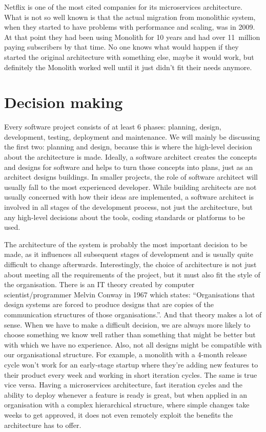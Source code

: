 \begin{note*}
    Netflix is one of the most cited companies for its microservices architecture. What is not so well known is that the actual migration from monolithic system, when they started to have problems with performance and scaling, was in 2009. At that point they had been using Monolith for 10 years and had over 11~million \cite{NETFLIX_2009_EARNINGS} paying subscribers by that time. No one knows what would happen if they started the original architecture with something else, maybe it would work, but definitely the Monolith worked well until it just didn't fit their needs anymore.
\end{note*}

\section{Decision making}
Every software project consists of at least 6 phases: planning, design, development, testing, deployment and maintenance. We will mainly be discussing the first two: planning and design, because this is where the high-level decision about the architecture is made. Ideally, a software architect creates the concepts and designs for software and helps to turn those concepts into plans, just as an architect designs buildings. In smaller projects, the role of software architect will usually fall to the most experienced developer. While building architects are not usually concerned with how their ideas are implemented, a software architect is involved in all stages of the development process, not just the architecture, but any high-level decisions about the tools, coding standards or platforms to be used.

The architecture of the system is probably the most important decision to be made, as it influences all subsequent stages of development and is usually quite difficult to change afterwards. Interestingly, the choice of architecture is not just about meeting all the requirements of the project, but it must also fit the style of the organisation. There is an IT theory created by computer scientist/programmer Melvin Conway in 1967 which states: ``Organisations that design systems are forced to produce designs that are copies of the communication structures of those organisations.''\cite{paper:conway:1968}. And that theory makes a lot of sense. When we have to make a difficult decision, we are always more likely to choose something we know well rather than something that might be better but with which we have no experience. Also, not all designs might be compatible with our organisational structure. For example, a monolith with a 4-month release cycle won't work for an early-stage startup where they're adding new features to their product every week and working in short iteration cycles. The same is true vice versa. Having a microservices architecture, fast iteration cycles and the ability to deploy whenever a feature is ready is great, but when applied in an organisation with a complex hierarchical structure, where simple changes take weeks to get approved, it does not even remotely exploit the benefits the architecture has to offer.

